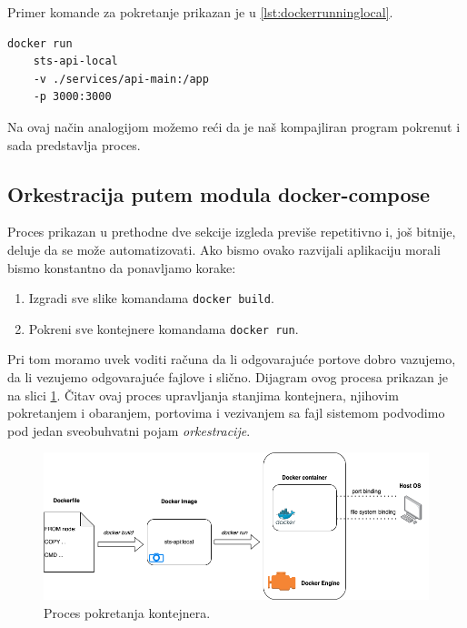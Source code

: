 \documentclass[12pt,oneside]{memoir}
\begin{document}
Primer komande za pokretanje prikazan je u \ref{lst:dockerrunninglocal}.

\begin{lstlisting}[caption={Pokretanje kontejnera}, label={lst:dockerrunninglocal}]
docker run 
    sts-api-local 
    -v ./services/api-main:/app 
    -p 3000:3000
\end{lstlisting}

Na ovaj način analogijom možemo reći da je naš kompajliran program pokrenut i sada predstavlja proces.

\subsection{Orkestracija putem modula docker-compose}

Proces prikazan u prethodne dve sekcije izgleda previše repetitivno i, još bitnije, deluje da se može automatizovati. Ako bismo ovako razvijali aplikaciju morali bismo konstantno da ponavljamo korake:
\begin{enumerate}
    \item Izgradi sve slike komandama \verb|docker build|.
    \item Pokreni sve kontejnere komandama \verb|docker run|.
\end{enumerate}

Pri tom moramo uvek voditi računa da li odgovarajuće portove dobro vazujemo, da li vezujemo odgovarajuće fajlove i slično. Dijagram ovog procesa prikazan je na slici \ref{fig:dockermanual}. Čitav ovaj proces upravljanja stanjima kontejnera, njihovim pokretanjem i obaranjem, portovima i vezivanjem sa fajl sistemom podvodimo pod jedan sveobuhvatni pojam \textit{orkestracije}.

\begin{figure}[h]
  \centering
  \includegraphics[width=1\textwidth]{docs/images/ch_6/dockermanual.png} 
  \caption{Proces pokretanja kontejnera.}
  \label{fig:dockermanual}
\end{figure}
\end{document}

